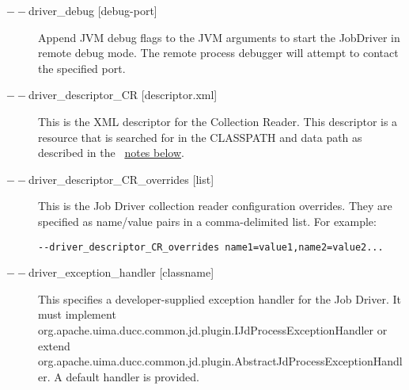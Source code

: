\begin{description}
           \item[$--$driver\_debug {[debug-port]}] Append JVM debug flags to the JVM arguments
             to start the JobDriver in remote debug mode.  The remote process debugger will attempt
             to contact the specified port.

           \item[$--$driver\_descriptor\_CR {[descriptor.xml]} ] This is the XML descriptor for the
             Collection Reader.  This descriptor is a resource that is searched for in the CLASSPATH
             and data path as described in the ~\hyperref[par:cli.submit.notes]{notes below}.

           \item[$--$driver\_descriptor\_CR\_overrides {[list]} ]             
             This is the Job Driver collection reader configuration overrides. They are specified as 
             name/value pairs in a comma-delimited list. For example: 
             \begin{verbatim}
--driver_descriptor_CR_overrides name1=value1,name2=value2...
             \end{verbatim}
             
             
%
%             

           \item[$--$driver\_exception\_handler {[classname]}] This specifies a developer-supplied
             exception handler for the Job Driver.  It must
             implement org.apache.uima.ducc.common.jd.plugin.IJdProcessExceptionHandler or extend
             org.apache.uima.ducc.common.jd.plugin.AbstractJdProcessExceptionHandler.  A default
             handler is provided.



\end{description}
